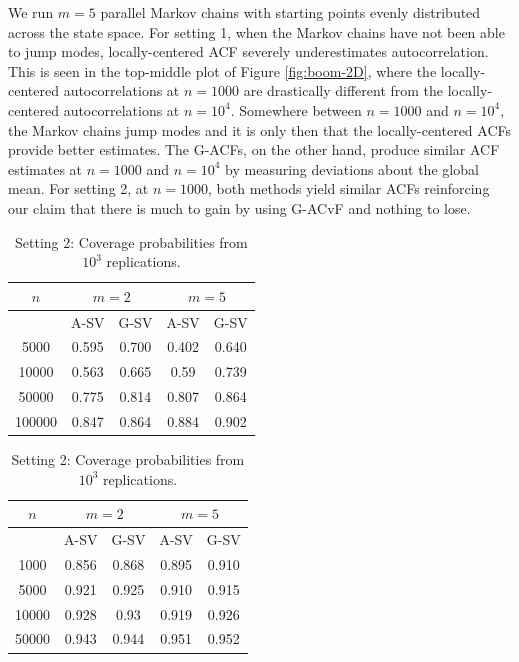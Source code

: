 \documentclass[12pt]{article}
\theoremstyle{remark}
\begin{document}
We run $m=5$ parallel Markov chains with starting points evenly distributed across the state space. For setting 1, when the Markov chains have not been able to jump modes, locally-centered ACF severely underestimates autocorrelation. This is seen in the top-middle plot of Figure \ref{fig:boom-2D}, where the locally-centered autocorrelations at $n=1000$ are drastically different from the locally-centered autocorrelations at $n = 10^4$. Somewhere between $n = 1000$ and $n = 10^4$, the Markov chains jump modes and it is only then that the locally-centered ACFs provide better estimates. The G-ACFs,  on the other hand, produce similar ACF estimates at $n = 1000$ and $n = 10^4$ by measuring deviations about the global mean. For setting 2, at $n = 1000$, both methods yield similar ACFs  reinforcing our claim that there is much to gain by using G-ACvF and nothing to lose.

\begin{table}[htbp]
\parbox{.45\linewidth}{
\centering
\small
\begin{tabular}{|c|c|c|c|c|}
\hline
 $n$ & \multicolumn{2}{|c|}{$m = 2$} & \multicolumn{2}{|c|}{$m=5$}\\
 \hline
 & A-SV & G-SV & A-SV & G-SV \\
 \hline
 5000 & 0.595 &  0.700 & 0.402 &  0.640\\
 10000 & 0.563 &  0.665 & 0.59 &  0.739\\
 50000 & 0.775 &  0.814 & 0.807 &  0.864\\
 100000 & 0.847 &  0.864 & 0.884 &  0.902\\
\hline
\end{tabular}
\caption{Setting 1: Coverage probabilities from $10^3$ replications.}
\label{tab:boom-coverage_1}
}
\hfill
\parbox{.45\linewidth}{
\centering
\small
\begin{tabular}{|c|c|c|c|c|}
 \hline
 $n$ & \multicolumn{2}{|c|}{$m = 2$} & \multicolumn{2}{|c|}{$m=5$}\\
 \hline
 & A-SV & G-SV & A-SV & G-SV \\
 \hline
 1000 &  0.856 &  0.868 & 0.895 &  0.910\\
 5000 & 0.921 &  0.925 & 0.910 &  0.915\\
 10000 & 0.928 &  0.93 & 0.919 &  0.926\\
 50000 & 0.943 &  0.944 & 0.951 &  0.952\\
\hline
\end{tabular}
\caption{Setting 2: Coverage probabilities from $10^3$ replications.}
\label{tab:boom-coverage_2}
}
\end{table}
\end{document}
